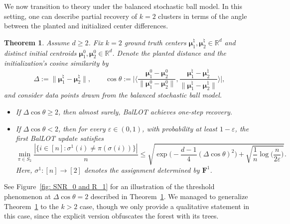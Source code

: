 \documentclass{article}
\theoremstyle{plain}
\newtheorem{theorem}{Theorem}
\theoremstyle{definition}
\newcommand{\1}{\mathbf{1}}
\newcommand{\hmu}{\bm{\mu}^\natural}
\newcommand{\bmF}{\bm{F}}
\newcommand{\bmu}{\bm{\mu}}
\begin{document}
We now transition to theory under the balanced stochastic ball model.
In this setting, one can describe partial recovery of $k=2$ clusters in terms of the angle between the planted and initialized center differences.

\begin{theorem}
\label{thm.k=2 misclustering rate}
Assume $d\geq2$.
Fix $k=2$ ground truth centers $\hmu_1,\hmu_2\in\mathbb{R}^d$ and distinct initial centroids $\bmu_1^0,\bmu_2^0\in\mathbb{R}^d$.
Denote the planted distance and the initialization's cosine similarity by
\[
\Delta:=\|\hmu_1-\hmu_2\|,
\qquad
\cos\theta:=\bigg|\bigg\langle
\frac{\bmu_1^0-\bmu_2^0}{\|\bmu_1^0-\bmu_2^0\|},
\frac{\hmu_1-\hmu_2}{\|\hmu_1-\hmu_2\|}
\bigg\rangle\bigg|,
\]
and consider data points drawn from the balanced stochastic ball model.
\begin{itemize}
\item[(a)] If $\Delta\cos\theta\geq2$, then almost surely, BalLOT achieves one-step recovery.
\item[(b)] If $\Delta\cos\theta<2$, then for every $\varepsilon\in(0,1)$, with probability at least $1-\varepsilon$, the first BalLOT update satisfies
\[
\min_{\pi\in S_2}\frac{|\{i\in[n]:\sigma^1(i)\neq\pi(\sigma(i))\}|}{n}
\leq
\sqrt{
\exp\bigg(-\frac{d-1}{4}(\Delta\cos\theta)^2\bigg)
+
\sqrt{\frac{1}{n}\log\bigg(\frac{n}{2\varepsilon}\bigg)}
}.
\]
Here, $\sigma^1\colon[n]\to[2]$ denotes the assignment determined by $\bmF^1$.
\end{itemize}
\end{theorem}

See Figure~\ref{fig: SNR_0 and R_1} for an illustration of the threshold phenomenon at $\Delta\cos\theta=2$ described in Theorem~\ref{thm.k=2 misclustering rate}.
We managed to generalize Theorem~\ref{thm.k=2 misclustering rate} to the $k>2$ case, though we only provide a qualitative statement in this case, since the explicit version obfuscates the forest with its trees.

\end{document}
